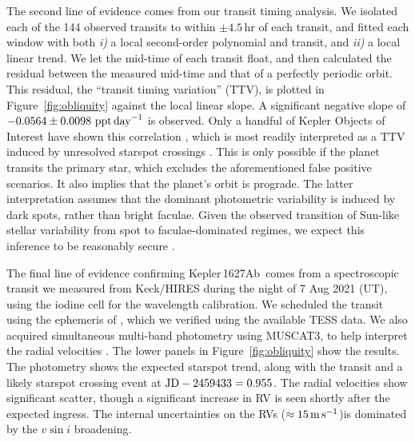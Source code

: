\documentclass[12pt,modern,twocolumn,tighten]{aastex63}
\newcommand{\pn}{Kepler\,1627Ab} %
\begin{document}
The second line of evidence comes from our transit timing analysis. We
isolated each of the 144 observed transits to within $\pm4.5$\,hr of
each transit, and fitted each window with both {\it i)} a local
second-order polynomial and transit, and {\it ii)} a local linear
trend.  We let the mid-time of each transit float, and then calculated
the residual between the measured mid-time and that of a perfectly
periodic orbit.  This residual, the ``transit timing variation''
(TTV), is plotted in Figure~\ref{fig:obliquity} against the local
linear slope.  A significant negative slope of $-0.0564 \pm 0.0098\
{\rm ppt\,day}^{-1}$ is observed.  Only a handful of Kepler Objects of
Interest have shown this correlation \citep{holczer_time_2015}, which
is most readily interpreted as a TTV induced by unresolved starspot
crossings \citep{mazeh_time_2015}.  This is only possible if the
planet transits the primary star, which excludes the aforementioned
false positive scenarios.  It also implies that the planet's orbit is
prograde.  The latter interpretation assumes that the dominant
photometric variability is induced by dark spots, rather than bright
faculae.  Given the observed transition of Sun-like stellar
variability from spot to faculae-dominated regimes, we expect this
inference to be reasonably secure
\citep{shapiro_are_2016,montet_long-term_2017,reinhold_stellar_2020}.

%
%

The final line of evidence confirming \pn\ comes from a spectroscopic
transit we measured from Keck/HIRES during the night of 7 Aug 2021
(UT), using the iodine cell for the wavelength calibration.  We
scheduled the transit using the ephemeris of
\citet{holczer_transit_2016}, which we verified using the available
TESS data.  We also acquired simultaneous multi-band photometry using
MUSCAT3, to help interpret the radial velocities \citep{Narita_2020}.
The lower panels in Figure~\ref{fig:obliquity} show the results.  The
photometry shows the expected starspot trend, along with the transit
and a likely starspot crossing event at ${\rm JD} - 2459433 = 0.955$.
The radial velocities show significant scatter, though a significant
increase in RV is seen shortly after the expected ingress.  The
internal uncertainties on the RVs ($\approx 15\,{\rm m\,s}^{-1}$)is
dominated by the $v\sin i$ broadening.
\end{document}
